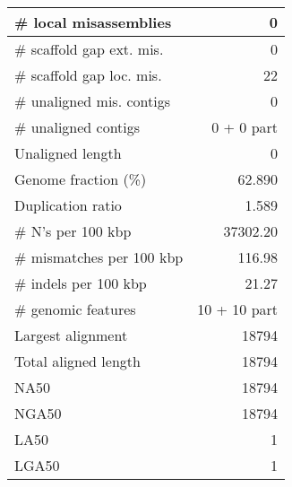 \documentclass[12pt,a4paper]{article}
\begin{document}
\begin{table}[ht]
\begin{center}
\begin{tabular}{|l*{1}{|r}|}
\# local misassemblies & 0 \\ \hline
\# scaffold gap ext. mis. & 0 \\ \hline
\# scaffold gap loc. mis. & 22 \\ \hline
\# unaligned mis. contigs & 0 \\ \hline
\# unaligned contigs & 0 + 0 part \\ \hline
Unaligned length & 0 \\ \hline
Genome fraction (\%) & 62.890 \\ \hline
Duplication ratio & 1.589 \\ \hline
\# N's per 100 kbp & 37302.20 \\ \hline
\# mismatches per 100 kbp & 116.98 \\ \hline
\# indels per 100 kbp & 21.27 \\ \hline
\# genomic features & 10 + 10 part \\ \hline
Largest alignment & 18794 \\ \hline
Total aligned length & 18794 \\ \hline
NA50 & 18794 \\ \hline
NGA50 & 18794 \\ \hline
LA50 & 1 \\ \hline
LGA50 & 1 \\ \hline
\end{tabular}
\end{center}
\end{table}
\end{document}

